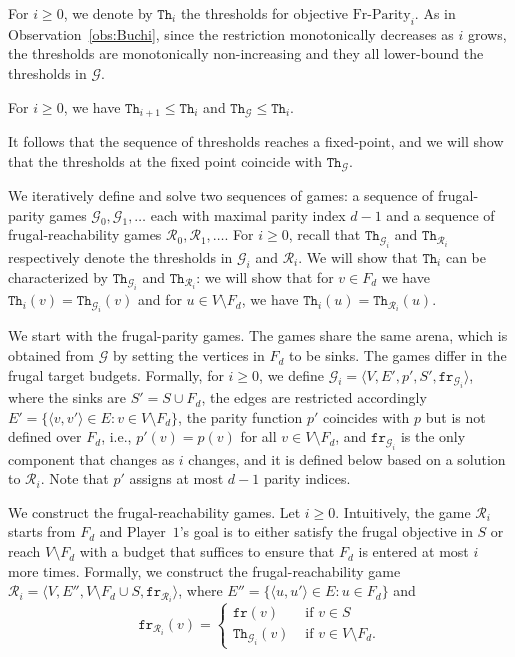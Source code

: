 \documentclass{theoretics}
\newcommand{\PO}{Player~$1$\xspace}
\newcommand{\G}{{\mathcal G}}
\newcommand{\R}{{\mathcal R}}
\newcommand{\fr}{\texttt{fr}}
\newcommand{\notFd}{V \setminus F_d}
\newcommand{\thresh}{\texttt{Th}\xspace}
\newcommand{\frparity}{\text{Fr-Parity}}
\newcommand{\zug}[1]{\langle #1  \rangle}
\renewcommand{\set}[1]{\{ #1  \}}
\begin{document}
For $i \geq 0$, we denote by $\thresh_i$ the thresholds for objective $\frparity_i$. As in Observation~\ref{obs:Buchi}, since the restriction monotonically decreases as $i$ grows, the thresholds are monotonically non-increasing and they all lower-bound the thresholds in $\G$.

\begin{observation}
\label{obs:parity}
For $i \geq 0$, we have $\thresh_{i+1} \leq \thresh_i$ and $\thresh_{\G} \leq \thresh_i$. 
\end{observation}
It follows that the sequence of thresholds reaches a fixed-point, and we will show that the thresholds at the fixed point coincide with $\thresh_\G$. 

We iteratively define and solve two sequences of games: a sequence of frugal-parity games $\G_0,\G_1,\ldots$ each with maximal parity index $d-1$ and a sequence of frugal-reachability games $\R_0,\R_1,\ldots$. For $i \geq 0$, recall that $\thresh_{\G_i}$ and $\thresh_{\R_i}$ respectively denote the thresholds in $\G_i$ and $\R_i$. We will show that $\thresh_i$ can be characterized by $\thresh_{\G_i}$ and $\thresh_{\R_i}$: we will show that for $v \in F_d$ we have $\thresh_i(v) = \thresh_{\G_i}(v)$ and for $u \in \notFd$, we have $\thresh_i(u) = \thresh_{\R_i}(u)$. 

We start with the frugal-parity games. The games share the same arena, which is obtained from $\G$ by setting the vertices in $F_d$ to be sinks. 
The games differ in the frugal target budgets. Formally, for $i \geq 0$, we define $\G_i = \zug{V, E', p', S', \fr_{\G_i}}$, where the sinks are $S' = S \cup F_d$, the edges are restricted accordingly $E' = \set{\zug{v, v'} \in E: v \in \notFd}$, the parity function $p'$ coincides with $p$ but is not defined over $F_d$, i.e., $p'(v) = p(v)$ for all $v \in V \setminus F_d$, and $\fr_{\G_i}$ is the only component that changes as \(i\) changes, and it is defined below based on a solution to $\R_i$.   Note that $p'$ assigns at most $d-1$ parity indices. 



We construct the frugal-reachability games. Let $i \geq 0$. Intuitively, the game $\R_i$ starts from $F_d$ and \PO's goal is to either satisfy the frugal objective in $S$ or reach $\notFd$ with a budget that suffices to ensure that $F_d$ is entered at most $i$ more times. Formally, we construct the frugal-reachability game $\R_i = \zug{V, E'', \notFd \cup S, \fr_{\R_i}}$, where $E'' = \set{\zug{u, u'} \in E: u \in F_d}$ and 
\[
\fr_{\R_i}(v) = \begin{cases}\fr(v) & \text{ if } v \in S\\ \thresh_{\G_i}(v) & \text{ if } v \in \notFd. \end{cases}
\]
\end{document}
